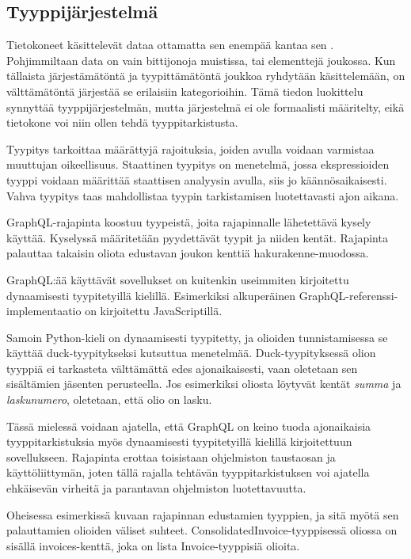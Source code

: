 \hypertarget{tyyppijuxe4rjestelmuxe4}{%
\subsection{Tyyppijärjestelmä}\label{tyyppijuxe4rjestelmuxe4}}

Tietokoneet käsittelevät dataa ottamatta sen enempää kantaa sen
. Pohjimmiltaan data on vain bittijonoja
muistissa, tai elementtejä joukossa. Kun tällaista järjestämätöntä ja
tyypittämätöntä joukkoa ryhdytään käsittelemään, on välttämätöntä
järjestää se erilaisiin kategorioihin. Tämä tiedon luokittelu synnyttää
tyyppijärjestelmän, mutta järjestelmä ei ole formaalisti määritelty,
eikä tietokone voi niin ollen tehdä tyyppitarkistusta.

Tyypitys tarkoittaa määrättyjä rajoituksia, joiden avulla voidaan
varmistaa muuttujan oikeellisuus. Staattinen tyypitys on menetelmä,
jossa ekspressioiden tyyppi voidaan määrittää staattisen analyysin
avulla, siis jo käännösaikaisesti. Vahva tyypitys taas mahdollistaa
tyypin tarkistamisen luotettavasti ajon aikana.
\cite{Cardelli+Wegner:1985}

GraphQL-rajapinta koostuu tyypeistä, joita rajapinnalle lähetettävä
kysely käyttää. Kyselyssä määritetään pyydettävät tyypit ja niiden
kentät. Rajapinta palauttaa takaisin oliota edustavan joukon kenttiä
\gls{hakurakenne}-muodossa. \cite{graphql:spec}

GraphQL:ää käyttävät sovellukset on kuitenkin useimmiten kirjoitettu
dynaamisesti tyypitetyillä kielillä. Esimerkiksi alkuperäinen
GraphQL-referenssi-implementaatio on kirjoitettu
JavaScriptillä.\cite{graphqlRefImple2021Oct}

Samoin Python-kieli on dynaamisesti tyypitetty, ja olioiden
tunnistamisessa se käyttää duck-tyypitykseksi kutsuttua menetelmää.
Duck-tyypityksessä olion tyyppiä ei tarkasteta välttämättä edes
ajonaikaisesti, vaan oletetaan sen sisältämien jäsenten
perusteella.\cite{pythonGloss2021Oct} Jos esimerkiksi oliosta löytyvät
kentät \emph{summa} ja \emph{laskunumero}, oletetaan, että olio on
lasku.

Tässä mielessä voidaan ajatella, että GraphQL on keino tuoda
ajonaikaisia tyyppitarkistuksia myös dynaamisesti tyypitetyillä kielillä
kirjoitettuun sovellukseen. Rajapinta erottaa toisistaan ohjelmiston
taustaosan ja käyttöliittymän, joten tällä rajalla tehtävän
tyyppitarkistuksen voi ajatella ehkäisevän virheitä ja parantavan
ohjelmiston luotettavuutta.

Oheisessa esimerkissä kuvaan rajapinnan edustamien tyyppien, ja sitä
myötä sen palauttamien olioiden väliset suhteet.
ConsolidatedInvoice-tyyppisessä oliossa on sisällä invoices-kenttä, joka
on lista Invoice-tyyppisiä olioita.

